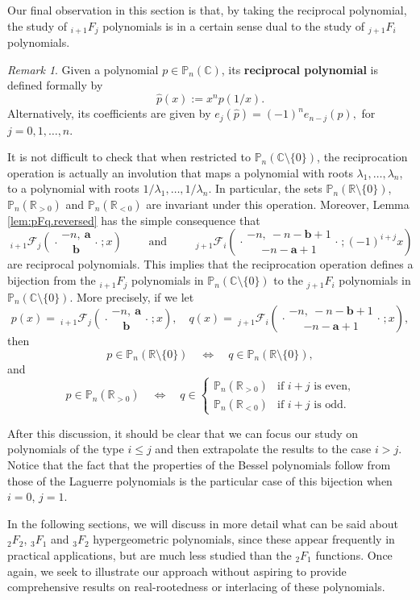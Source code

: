 \documentclass[reqno,11pt]{amsart}
\theoremstyle{remark}
\newtheorem{remark}[theorem]{Remark}
\renewcommand{\P}{\mathbb{P}}
\newcommand{\R}{\mathbb{R}}
\newcommand{\cc}{\mathbb{C}}
\newcommand{\pp}{\mathbb{P}}
\newcommand{\rr}{\mathbb{R}}
\newcommand*\pFq[5]{%
 {\ }_{#1}{\mathcal F}_{#2}{\left(\genfrac..{0pt}{}{#3}{#4};#5\right)}%
}
\begin{document}
Our final observation in this section is that, by taking the reciprocal polynomial, the study of ${}_{i+1}F_j$ polynomials is in a certain sense dual to the study of ${}_{j+1}F_i$ polynomials. 
\begin{remark}
\label{rem:pFq.reversed}
Given a polynomial $p\in \pp_n(\cc)$, its \textbf{reciprocal polynomial} is defined formally by 
\begin{equation}
    \label{eq.def.reversed}
\hat{p}(x):=x^n p(1/x).
\end{equation}
Alternatively, its coefficients are given by $e_j(\hat{p}) = (-1)^n e_{n-j}(p),$ for $j=0, 1, \dots, n.$

It is not difficult to check that when restricted to $\pp_n(\cc\setminus \{0\})$, the reciprocation operation is actually an involution that maps a polynomial with roots $\lambda_1,\dots, \lambda_n$, to a polynomial with roots $1/\lambda_1,\dots, 1/\lambda_n$. In particular, the sets $\pp_n(\rr\setminus \{0\})$, $\pp_n(\rr_{>0})$ and $\pp_n(\rr_{<0})$ are invariant under this operation. Moreover, Lemma \ref{lem:pFq.reversed} has the simple consequence that
$$\pFq{i+1}{j}{-n,\ \bm a}{ \bm b}{x}\qquad \text{ and }\qquad \pFq{j+1}{i}{-n,\ -n -{\bm b} +1}{ -n -{\bm a} +1}{(-1)^{i+j}x}$$
are reciprocal polynomials. This implies that the reciprocation operation defines a bijection from the ${}_{i+1}F_j$ polynomials in $\pp_n(\cc\setminus \{0\})$ to the ${}_{j+1}F_i$ polynomials in $\pp_n(\cc\setminus \{0\})$. More precisely, if we let
$$
p(x)=\pFq{i+1}{j}{-n,\ \bm a}{ \bm b}{x}, \quad q(x)= \pFq{j+1}{i}{-n,\ -n -{\bm b} +1}{ -n -{\bm a} +1}{x},
$$
then
$$
p\in \P_n(\R\setminus\{0\})  \quad \Longleftrightarrow \quad q\in \P_n(\R\setminus\{0\}),
$$
and 
$$
p\in \P_n(\R_{>0})  \quad \Longleftrightarrow \quad q \in \begin{cases}
    \P_n(\R_{>0}) & \text{if $i+j$ is even,} \\ 
     \P_n(\R_{<0}) & \text{if $i+j$ is odd.}
\end{cases}
$$

After this discussion, it should be clear that we can focus our study on polynomials of the type $i\leq j$ and then extrapolate the results to the case $i>j$. Notice that the fact that the properties of the Bessel polynomials follow from those of the Laguerre polynomials is the particular case of this bijection when $i=0$, $j=1$.
\end{remark}

In the following sections, we will discuss in more detail what can be said about ${}_2 F_2$, ${}_3 F_1$ and ${}_3 F_2$ hypergeometric polynomials, since these appear frequently in practical applications, but are much less studied than the ${}_2 F_1$ functions. Once again, we seek to illustrate our approach without aspiring to provide comprehensive results on real-rootedness or interlacing of these polynomials.   
\end{document}
